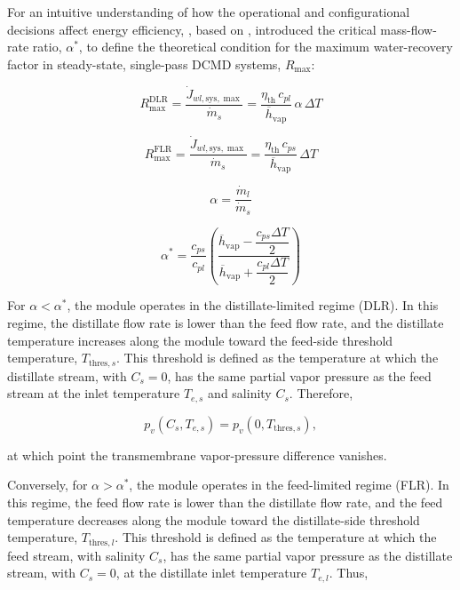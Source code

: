 \documentclass[14pt,letterpaper,fleqn]{extarticle}
\begin{document}
For an intuitive understanding of how the operational and configurational decisions
affect energy efficiency, \citet{Christie2020}, based on \citet{Lin2014}, introduced
the critical mass-flow-rate ratio, $\alpha^*$, to define the theoretical condition for
the maximum water-recovery factor in steady-state, single-pass DCMD systems,
$R_{\max}$:

\begin{equation}
R_{\max}^{\mathrm{DLR}}
=
\frac{\dot{J}_{wl,\mathrm{sys},\max}}
{\dot{m}_{s}}
=
\frac{\eta_{\mathrm{th}}\,c_{pl}}
{\overline{h}_{\mathrm{vap}}}
\,\alpha\,\Delta T
\label{eq:Rmax_DLR}
\end{equation}

\begin{equation}
R_{\max}^{\mathrm{FLR}}
=
\frac{\dot{J}_{wl,\mathrm{sys},\max}}
{\dot{m}_{s}}
=
\frac{\eta_{\mathrm{th}}\,c_{ps}}
{\overline{h}_{\mathrm{vap}}}
\,\Delta T
\label{eq:Rmax_FLR}
\end{equation}

\begin{equation}
\alpha
=
\frac{\dot{m}_{l}}
{\dot{m}_{s}}
\label{eq:flow_rate_ratio_alpha}
\end{equation}

\begin{equation}
\alpha^{*}
=
\frac{c_{ps}}{c_{pl}}
\left(
\frac{
\overline{h}_{\mathrm{vap}}
-
\dfrac{c_{ps}\Delta T}{2}
}{
\overline{h}_{\mathrm{vap}}
+
\dfrac{c_{pl}\Delta T}{2}
}
\right)
\label{eq:critical_flow_rate_ratio}
\end{equation}

For $\alpha < \alpha^{*}$, the module operates in the distillate-limited regime (DLR). In this regime, the distillate flow rate is lower than the feed flow rate, and the distillate temperature increases along the module toward the feed-side threshold temperature, $T_{\mathrm{thres},s}$. This threshold is defined as the temperature at which the distillate stream, with $C_s = 0$, has the same partial vapor pressure as the feed stream at the inlet temperature $T_{e,s}$ and salinity $C_s$. Therefore,

\begin{equation}
p_v\left(C_s,T_{e,s}\right)
=
p_v\left(0,T_{\mathrm{thres},s}\right),
\label{eq:threshold_temperature_DLR}
\end{equation}

at which point the transmembrane vapor-pressure difference vanishes.

Conversely, for $\alpha > \alpha^{*}$, the module operates in the feed-limited regime (FLR). In this regime, the feed flow rate is lower than the distillate flow rate, and the feed temperature decreases along the module toward the distillate-side threshold temperature, $T_{\mathrm{thres},l}$. This threshold is defined as the temperature at which the feed stream, with salinity $C_s$, has the same partial vapor pressure as the distillate stream, with $C_s = 0$, at the distillate inlet temperature $T_{e,l}$. Thus,
\end{document}
